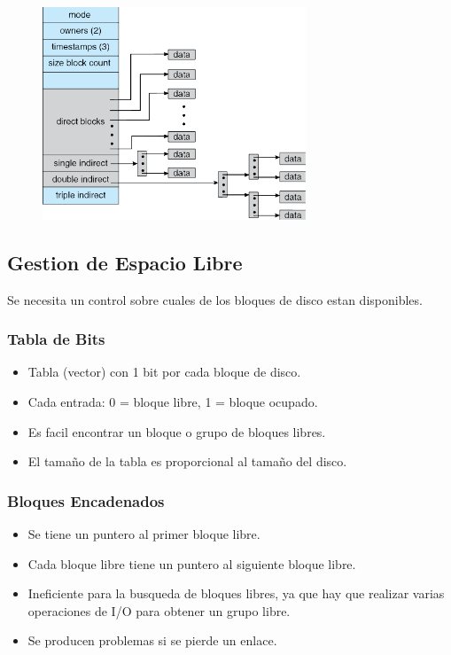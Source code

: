 \documentclass[12pt]{article}
\begin{document}
\begin{figure}[ht]
    \begin{center}
        \includegraphics[width=0.70\textwidth]{assets/NivelesIndireccion.pdf}
    \end{center}
\end{figure}

\pagebreak

\subsection{Gestion de Espacio Libre}
Se necesita un control sobre cuales de los bloques de disco estan disponibles.

\subsubsection{Tabla de Bits}
\begin{itemize}
    \item Tabla (vector) con 1 bit por cada bloque de disco.
    \item Cada entrada: 0 = bloque libre, 1 = bloque ocupado.
    \item Es facil encontrar un bloque o grupo de bloques libres.
    \item El tamaño de la tabla es proporcional al tamaño del disco.
\end{itemize}

\subsubsection{Bloques Encadenados}
\begin{itemize}
    \item Se tiene un puntero al primer bloque libre.
    \item Cada bloque libre tiene un puntero al siguiente bloque libre.
    \item Ineficiente para la busqueda de bloques libres, ya que hay que realizar varias operaciones de I/O para obtener un grupo libre.
    \item Se producen problemas si se pierde un enlace.
\end{itemize}
\end{document}
